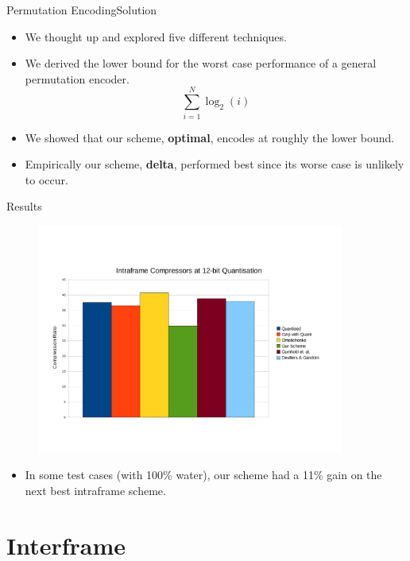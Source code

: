 \documentclass{beamer}
\begin{document}
\begin{frame}{Permutation Encoding}{Solution}
  \begin{itemize}
  \item We thought up and explored five different techniques.
  \item We derived the lower bound for the worst case performance of a general
    permutation encoder.
    \begin{equation*}
      \displaystyle\sum^{N}_{i=1} \log_2(i)
    \end{equation*}
  \item We showed that our scheme, \textbf{optimal}, encodes at roughly the
    lower bound.
  \item Empirically our scheme, \textbf{delta}, performed best since its worse
    case is unlikely to occur.
  \end{itemize}
\end{frame}

\begin{frame}{Results}
  \begin{figure}[h]
    \centering \includegraphics[trim = 10mm 30mm 10mm 35mm, clip,
      width=0.9\textwidth]{keegan-images/results-average}
  \end{figure}
  \begin{itemize}
  \item In some test cases (with 100\% water), our scheme had a 11\% gain on
    the next best intraframe scheme.
  \end{itemize}
\end{frame}


\section{Interframe}
\end{document}
